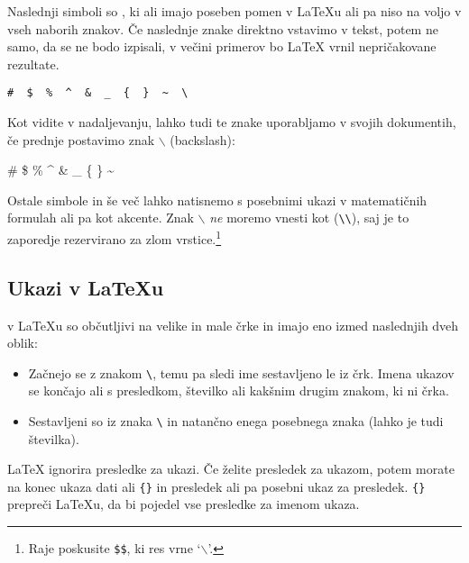 Naslednji simboli so , ki ali imajo poseben pomen
v \LaTeX{}u ali pa niso na voljo v vseh naborih znakov.
Če naslednje znake direktno vstavimo v tekst, potem ne samo, da se ne bodo izpisali,
v večini primerov bo \LaTeX{} vrnil nepričakovane rezultate. 
\begin{code}
\verb.#  $  %  ^  &  _  {  }  ~  \ . %
\end{code}

Kot vidite v nadaljevanju, lahko tudi te znake uporabljamo v svojih dokumentih,
če prednje postavimo znak $\backslash$ (backslash):

\begin{example}
\# \$ \% \^{} \& \_ \{ \} \~{} 
\end{example}

Ostale simbole in še več lahko natisnemo s posebnimi ukazi 
v matematičnih formulah ali pa kot akcente. Znak 
$\backslash$ \emph{ne} moremo vnesti kot (\verb|\\|), saj je to zaporedje rezervirano 
za zlom vrstice.\footnote{Raje poskusite \texttt{\$}\texttt{\$}, ki res vrne 
  `$\backslash$'.}


\subsection{Ukazi v \LaTeX{}u}

 v \LaTeX{}u so občutljivi na velike in male črke in imajo eno izmed naslednjih dveh oblik:

\begin{itemize}
\item Začnejo se z znakom \verb|\|, temu pa sledi ime sestavljeno le iz črk. 
 Imena ukazov se končajo ali s presledkom, številko ali kakšnim drugim znakom, ki ni črka.
\item Sestavljeni so iz znaka \verb|\| in natančno enega posebnega znaka (lahko je tudi številka).
\end{itemize}

%
%

%
%
\label{whitespace}

\LaTeX{} ignorira presledke za ukazi. Če želite 
presledek za ukazom, potem morate na konec ukaza
dati ali \verb|{}| in presledek ali pa posebni ukaz za presledek. \verb|{}|{} prepreči \LaTeX{}u, da 
bi pojedel vse presledke za imenom ukaza. 

